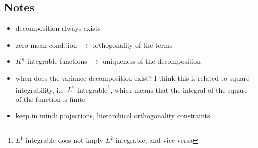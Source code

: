 \subsection*{Notes}
\begin{itemize}
    \item decomposition always exists
    \item zero-mean-condition $\rightarrow$ orthogonality of the terms
    \item $K^n$-integrable functions $\rightarrow$ uniqueness of the decomposition
    \item when does the variance decomposition exist? I think this is related to square integrability, i.e. $L^2$ integrable\footnote{$L^1$ integrable does not imply $L^2$ integrable, and vice versa}, which means that the integral of the square of the function is finite
    \item keep in mind: projections, hierarchical orthogonality constraints
\end{itemize}











